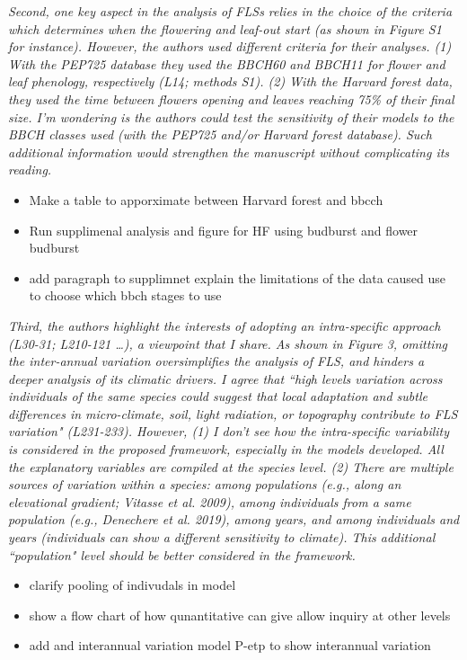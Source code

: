 \documentclass{article}[11pt]
\begin{document}
\emph{Second, one key aspect in the analysis of FLSs relies in the choice of the criteria which determines when the flowering and leaf-out start (as shown in Figure S1 for instance). However, the authors used different criteria for their analyses. (1) With the PEP725 database they used the BBCH60 and BBCH11 for flower and leaf phenology, respectively (L14; methods S1). (2) With the Harvard forest data, they used the time between flowers opening and leaves reaching 75\% of their final size. I’m wondering is the authors could test the sensitivity of their models to the BBCH classes used (with the PEP725 and/or Harvard forest database). Such additional information would strengthen the manuscript without complicating its reading.}
\begin{itemize}
\item Make a table to apporximate between Harvard forest and bbcch
\item Run supplimenal analysis and figure for HF using budburst and flower budburst
\item add paragraph to supplimnet explain the limitations of the data caused use to choose which bbch stages to use
\end{itemize}
\emph{Third, the authors highlight the interests of adopting an intra-specific approach (L30-31; L210-121 …), a viewpoint that I share. As shown in Figure 3, omitting the inter-annual variation oversimplifies the analysis of FLS, and hinders a deeper analysis of its climatic drivers. I agree that ``high levels variation across individuals of the same species could suggest that local adaptation and subtle differences in micro-climate, soil, light radiation, or topography contribute to FLS variation" (L231-233). However, (1) I don't see how the intra-specific variability is considered in the proposed framework, especially in the models developed. All the explanatory variables are compiled at the species level. (2) There are multiple sources of variation within a species: among populations (e.g., along an elevational gradient; Vitasse et al. 2009), among individuals from a same population (e.g., Denechere et al. 2019), among years, and among individuals and years (individuals can show a different sensitivity to climate). This additional ``population" level should be better considered in the framework.}
\begin{itemize}
\item clarify pooling of indivudals in model
\item show a flow chart of how qunantitative can give allow inquiry at other levels
\item add and interannual variation model P-etp to show interannual variation
\end{itemize}
\end{document}
